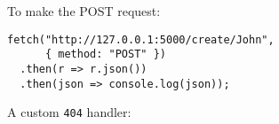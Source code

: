 \documentclass[../index.tex]{subfiles}
\begin{document}
\begin{frame}[fragile]{\currenttitle}
  To make the POST request: \\
  \vspace*{1em}

  \begin{lstlisting}[language=ES6,basicstyle=\ttfamily\normalsize]
fetch("http://127.0.0.1:5000/create/John",
      { method: "POST" })
  .then(r => r.json())
  .then(json => console.log(json));
  \end{lstlisting}
\end{frame}

\begin{frame}[fragile]{\currenttitle}
  A custom \texttt{404} handler:
\end{frame}


\end{document}
